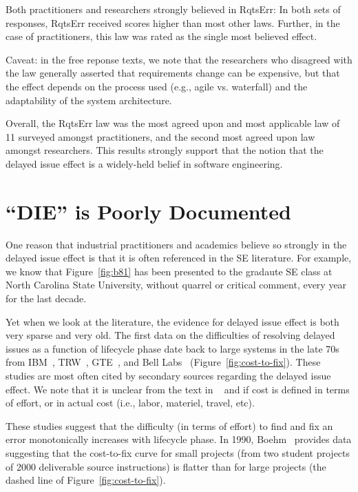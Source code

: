 \documentclass[smallcondesed]{svjour3}
\newcommand{\fig}[1]{Figure~\ref{fig:#1}}
\begin{document}
Both  practitioners and researchers  strongly believed in RqtsErr: In both sets of responses, RqtsErr received  scores higher than most
other laws. Further, in the case of practitioners, this law was rated
as the single most believed effect. 
 
Caveat: in the free reponse texts, we note that the researchers who disagreed with the law generally asserted that requirements change can be expensive, but that the effect depends on the process used (e.g., agile vs. waterfall) and the adaptability of the system architecture.

Overall, the RqtsErr law was the most agreed upon and most applicable law of 11 surveyed amongst practitioners, and the second most agreed upon law amongst researchers. 
This results strongly support that the notion that the  delayed issue effect   is a widely-held belief in software engineering.

\section{``DIE'' is Poorly  Documented}
 
One reason that industrial practitioners and academics believe so strongly in the delayed issue effect is that it is often referenced
in the SE literature. For example,
we know that \fig{b81} has been presented to the gradaute SE class at North Carolina State University, without quarrel or critical comment, every year for the last decade.

Yet when we look at the literature, the evidence for
delayed issue effect is both very sparse and very old.
The first data on the difficulties of resolving delayed issues as a function of lifecycle phase date back to large systems in the late 70s from IBM~\cite{Fagan76}, TRW~\cite{Boehm76}, GTE~\cite{Daly77}, and Bell Labs~\cite{Stephenson76} (Figure~\ref{fig:cost-to-fix}). These studies are most often cited by secondary sources regarding the delayed issue effect. We note that it is unclear from the text in ~\cite{Daly77} and \cite{Boehm76} if cost is defined in terms of effort, or in actual cost (i.e., labor, materiel, travel, etc).

These studies suggest that the difficulty (in terms of effort) to find and fix an error monotonically increases with lifecycle phase.  In 1990, Boehm~\cite{Boehm80} provides data suggesting that the cost-to-fix curve for small projects (from two student projects of 2000 deliverable source instructions) is flatter than for large projects (the dashed line of Figure~\ref{fig:cost-to-fix}).
\end{document}
